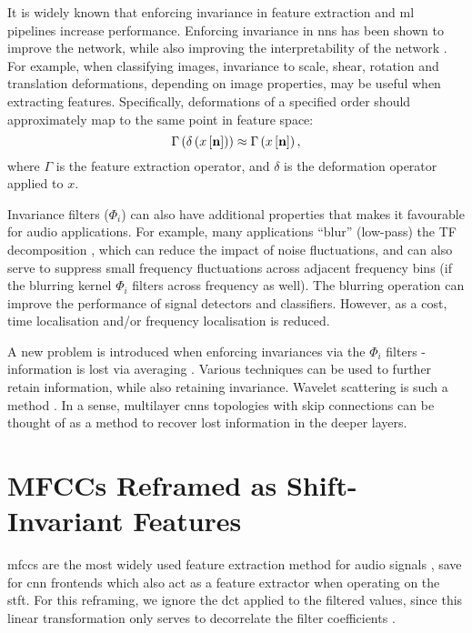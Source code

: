 It is widely known that enforcing invariance in feature extraction and \ac{ml} pipelines increase performance. Enforcing invariance in \acp{nn} has been shown to improve the network, while also improving the interpretability of the network \cite{cnninvariance2}. For example, when classifying images, invariance to scale, shear, rotation and translation deformations, de\-pending on image properties, may be useful when extracting features. Specifically, defor\-mations of a specified order should approximately map to the same point in feature space:
\begin{equation}
    \Gamma\left(\delta\left(x\left[\boldsymbol{\mathbf{n}}\right]\right)\right) \approx \Gamma\left(x\left[\boldsymbol{\mathbf{n}}\right]\right),
\end{equation}
where $\Gamma$ is the feature extraction operator, and $\delta$ is the deformation operator applied to $x$.

Invariance filters ($\Phi_i$) can also have additional properties that makes it favourable for audio applications. For example, many applications ``blur'' (low-pass) the TF decom\-position \citep{seyicwt, speechmodulation}, which can reduce the impact of noise fluctuations, and can also serve to suppress small frequency fluctuations across adjacent frequency bins (if the blurring kernel $\Phi_i$ filters across frequency as well). The blurring operation can improve the performance of signal detectors and classifiers. However, as a cost, time localisation and/or frequency localisation is reduced.

A new problem is introduced when enforcing invariances via the $\Phi_i$ filters - information is lost via averaging \cite{1dscattering1}. Various techniques can be used to further retain information, while also retaining invariance. Wavelet scattering is such a method \cite{ws,2dscattering}. In a sense, multilayer \acp{cnn} topologies with skip connections can be thought of as a method to recover lost information in the deeper layers.

\section{MFCCs Reframed as Shift-Invariant Features}

\acp{mfcc} are the most widely used feature extraction method for audio signals \citep{mfccreview}, save for \ac{cnn} frontends which also act as a feature extractor when operating on the \ac{stft}. For this reframing, we ignore the \ac{dct} applied to the filtered values, since this linear transformation only serves to decorrelate the filter coefficients \citep{dctdecorrelation}.

